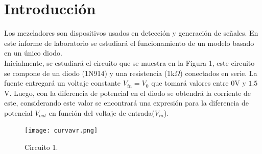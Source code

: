 \documentclass[letterpaper,oneside]{article}
\begin{document}
	
\templatePortrait

\templatePagecfg

%
%

\templateFinalcfg


\section{Introducción}
Los mezcladores son dispositivos usados en detección y generación de señales. En este informe de laboratorio se estudiará el funcionamiento de un modelo basado en un único diodo.\\

Inicialmente, se estudiará el circuito que se muestra en la Figura 1, este circuito se compone de un diodo (1N914) y una resistencia (1k$\Omega$) conectados en serie. La fuente entregará un voltaje constante $V_{in}= V_0$ que tomará valores entre $0$V y $1.5$V. Luego, con la diferencia de potencial en el diodo se obtendrá la corriente de este, considerando este valor se encontrará una expresión para la diferencia de potencial $V_{out}$ en función del voltaje de entrada($V_{in}$).\\

\begin{figure}
  \centering
  \texttt{[image: curvavr.png]}
  \caption{Circuito 1.}
\end{figure}
\end{document}
